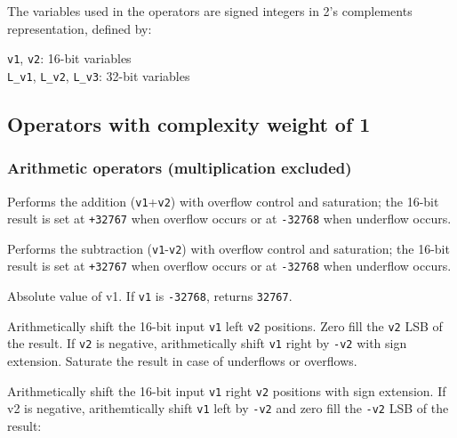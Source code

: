 The variables used in the operators are signed integers in 2's complements representation, defined by:

{\tt v1}, {\tt v2}: 16-bit variables\\
{\tt L\_v1}, {\tt L\_v2}, {\tt L\_v3}: 32-bit variables

\subsection{Operators with complexity weight of 1}
\subsubsection{Arithmetic operators (multiplication excluded)}


Performs the addition ({\tt v1}+{\tt v2}) with overflow control and saturation; the 16-bit result is set at {\tt +32767} when overflow occurs or at {\tt -32768} when underflow occurs.


Performs the subtraction ({\tt v1}-{\tt v2}) with overflow control and saturation; the 16-bit result is set at {\tt +32767} when overflow occurs or at {\tt -32768} when underflow occurs.


Absolute value of v1.
If {\tt v1} is {\tt -32768}, returns {\tt 32767}.


Arithmetically shift the 16-bit input {\tt v1} left {\tt v2} positions.
Zero fill the {\tt v2} LSB of the result.
If {\tt v2} is negative, arithmetically shift {\tt v1} right by {\tt -v2} with sign extension.
Saturate the result in case of underflows or overflows.


Arithmetically shift the 16-bit input {\tt v1} right {\tt v2} positions with sign extension.
If v2 is negative, arithemtically shift {\tt v1} left by {\tt -v2} and zero fill the {\tt -v2} LSB of the result:

